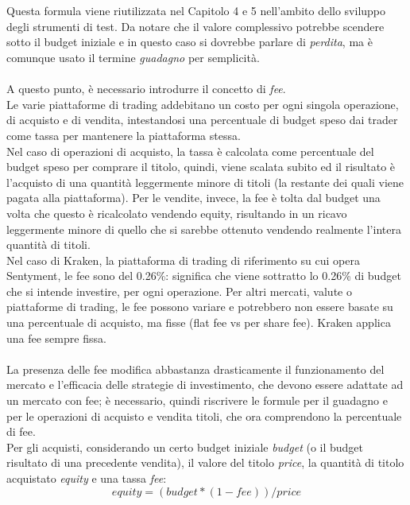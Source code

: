 \documentclass[a4paper,12pt]{report}
\begin{document}
\\~\\
Questa formula viene riutilizzata nel Capitolo 4 e 5 nell'ambito dello sviluppo degli strumenti di test. Da notare che il valore complessivo potrebbe scendere sotto il budget iniziale e in questo caso si dovrebbe parlare di \textit{perdita}, ma è comunque usato il termine \textit{guadagno} per semplicità.\\~\\
A questo punto, è necessario introdurre il concetto di \textit{fee}.\\
Le varie piattaforme di trading addebitano un costo per ogni singola operazione, di acquisto e di vendita, intestandosi una percentuale di budget speso dai trader come tassa per mantenere la piattaforma stessa.\\ Nel caso di operazioni di acquisto, la tassa è calcolata come percentuale del budget speso per comprare il titolo, quindi, viene scalata subito ed il risultato è l'acquisto di una quantità leggermente minore di titoli (la restante dei quali viene pagata alla piattaforma). Per le vendite, invece, la fee è tolta dal budget una volta che questo è ricalcolato vendendo equity, risultando in un ricavo leggermente minore di quello che si sarebbe ottenuto vendendo realmente l'intera quantità di titoli.\\
Nel caso di Kraken, la piattaforma di trading di riferimento su cui opera Sentyment, le fee sono del 0.26\%: significa che viene sottratto lo 0.26\% di budget che si intende investire, per ogni operazione. Per altri mercati, valute o piattaforme di trading, le fee possono variare e potrebbero non essere basate su una percentuale di acquisto, ma fisse (flat fee vs per share fee). Kraken applica una fee sempre fissa.
\\~\\
La presenza delle fee modifica abbastanza drasticamente il funzionamento del mercato e l'efficacia delle strategie di investimento, che devono essere adattate ad un mercato con fee; è necessario, quindi riscrivere le formule per il guadagno e per le operazioni di acquisto e vendita titoli, che ora comprendono la percentuale di fee.\\
Per gli acquisti, considerando un certo budget iniziale \textit{budget} (o il budget risultato di una precedente vendita), il valore del titolo \textit{price}, la quantità di titolo acquistato \textit{equity} e una tassa \textit{fee}:\\
\begin{equation}
equity=(budget*(1-fee))/price
\end{equation}
\end{document}
